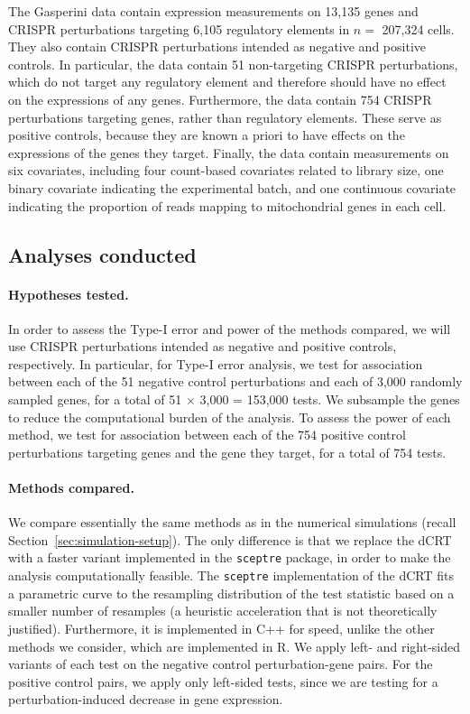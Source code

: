 \documentclass[12pt]{article}
\theoremstyle{definition}
\begin{document}
The Gasperini data contain expression measurements on 13,135 genes and CRISPR perturbations targeting 6,105 regulatory elements in $n =$ 207,324 cells. They also contain CRISPR perturbations intended as negative and positive controls. In particular, the data contain 51 non-targeting CRISPR perturbations, which do not target any regulatory element and therefore should have no effect on the expressions of any genes. Furthermore, the data contain 754 CRISPR perturbations targeting genes, rather than regulatory elements. These serve as positive controls, because they are known a priori to have effects on the expressions of the genes they target. Finally, the data contain measurements on six covariates, including four count-based covariates related to library size, one binary covariate indicating the experimental batch, and one continuous covariate indicating the proportion of reads mapping to mitochondrial genes in each cell.

\subsection{Analyses conducted}

\paragraph{Hypotheses tested.} In order to assess the Type-I error and power of the methods compared, we will use CRISPR perturbations intended as negative and positive controls, respectively. In particular, for Type-I error analysis, we test for association between each of the 51 negative control perturbations and each of 3,000 randomly sampled genes, for a total of 51 $\times$ 3,000 = 153,000 tests. We subsample the genes to reduce the computational burden of the analysis. To assess the power of each method, we test for association between each of the 754 positive control perturbations targeting genes and the gene they target, for a total of 754 tests. 

\paragraph{Methods compared.} We compare essentially the same methods as in the numerical simulations (recall Section~\ref{sec:simulation-setup}). The only difference is that we replace the dCRT with a faster variant implemented in the \verb|sceptre| package, in order to make the analysis computationally feasible. The \verb|sceptre| implementation of the dCRT fits a parametric curve to the resampling distribution of the test statistic based on a smaller number of resamples (a heuristic acceleration that is not theoretically justified). Furthermore, it is implemented in C++ for speed, unlike the other methods we consider, which are implemented in R. We apply left- and right-sided variants of each test on the negative control perturbation-gene pairs. For the positive control pairs, we apply only left-sided tests, since we are testing for a perturbation-induced decrease in gene expression.
\end{document}
